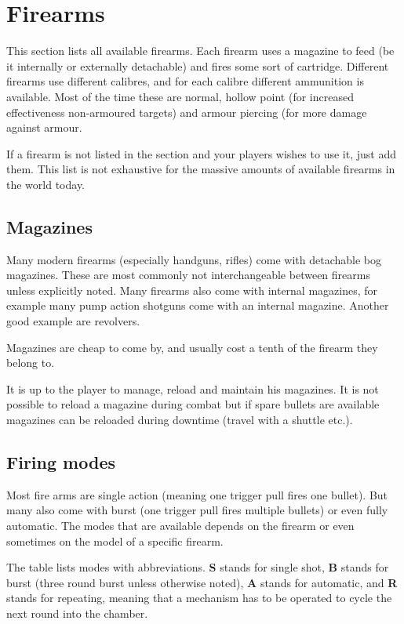 \section{Firearms}

This section lists all available firearms. Each firearm uses a magazine to feed
(be it internally or externally detachable) and fires some sort of cartridge.
Different firearms use different calibres, and for each calibre different
ammunition is available. Most of the time these are normal, hollow point (for
increased effectiveness non-armoured targets) and armour piercing (for more
damage against armour.

If a firearm is not listed in the section and your players wishes to use it,
just add them. This list is not exhaustive for the massive amounts of available
firearms in the world today.

\subsection{Magazines}

Many modern firearms (especially handguns, rifles) come with detachable bog
magazines. These are most commonly not interchangeable between firearms unless
explicitly noted. Many firearms also come with internal magazines, for example
many pump action shotguns come with an internal magazine. Another good example
are revolvers.

Magazines are cheap to come by, and usually cost a tenth of the firearm they
belong to.

It is up to the player to manage, reload and maintain his magazines. It is not
possible to reload a magazine during combat but if spare bullets are available
magazines can be reloaded during downtime (travel with a shuttle etc.).

\subsection{Firing modes}

Most fire arms are single action (meaning one trigger pull fires one bullet).
But many also come with burst (one trigger pull fires multiple bullets) or
even fully automatic. The modes that are available depends on the firearm or
even sometimes on the model of a specific firearm.

The table lists modes with abbreviations. \textbf{S} stands for single shot,
\textbf{B} stands for burst (three round burst unless otherwise noted),
\textbf{A} stands for automatic, and \textbf{R} stands for repeating, meaning
that a mechanism has to be operated to cycle the next round into the chamber.

